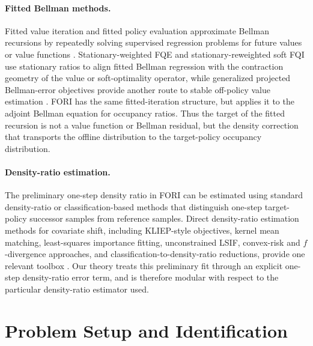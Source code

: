 \documentclass{article}
\newcommand{\1}{\mathbf{1}}
\theoremstyle{plain}
\theoremstyle{definition}
\theoremstyle{remark}
\begin{document}
\paragraph{Fitted Bellman methods.}
Fitted value iteration and fitted policy evaluation approximate Bellman
recursions by repeatedly solving supervised regression problems for future values
or value functions
\citep{lagoudakisParr2003LSPI,ernstEtAl2005TreeBatchRL,antosEtAl2007FQI,munosSzepesvari2008FVI,leEtAl2019BatchPolicyConstraints}.
Stationary-weighted FQE and stationary-reweighted soft FQI use stationary ratios
to align fitted Bellman regression with the contraction geometry of the value or
soft-optimality operator, while generalized projected Bellman-error objectives
provide another route to stable off-policy value estimation
\citep{vanDerLaanKallus2025StationaryWeightedFQE,vanDerLaanKallus2025SoftFQI,pattersonEtAl2022GeneralizedPBE}.
\textsc{FORI} has the same fitted-iteration structure, but applies it to the
adjoint Bellman equation for occupancy ratios. Thus the target of the fitted
recursion is not a value function or Bellman residual, but the density correction
that transports the offline distribution to the target-policy occupancy
distribution.

\paragraph{Density-ratio estimation.}
The preliminary one-step density ratio in \textsc{FORI} can be estimated using standard
density-ratio or classification-based methods that distinguish one-step
target-policy successor samples from reference samples. Direct density-ratio
estimation methods for covariate shift, including KLIEP-style objectives,
kernel mean matching, least-squares importance fitting, unconstrained LSIF,
convex-risk and $f$-divergence approaches, and classification-to-density-ratio
reductions, provide one relevant toolbox
\citep{tsuboiEtAl2008KLIEP,huangEtAl2006KMM,kanamoriEtAl2009LSIF,nguyenEtAl2010ConvexRatio,menonOng2016DensityRatioClassification,sugiyamaEtAl2012DensityRatioBook}.
Our theory treats this preliminary fit through an explicit one-step density-ratio error term,
and is therefore modular with respect to the particular density-ratio estimator
used.

\section{Problem Setup and Identification}
\end{document}
